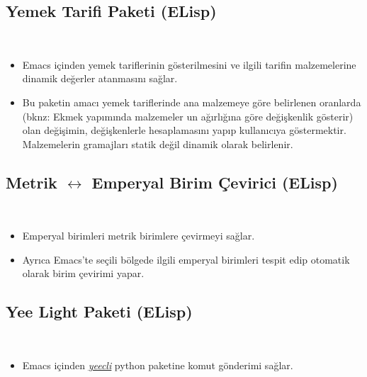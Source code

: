 \documentclass[a4paper, 9pt]{extarticle}
\begin{document}
\subsection{Yemek Tarifi Paketi (ELisp)} \label{lisp:frp} \hfill \\
\begin{itemize}
	\item Emacs içinden yemek tariflerinin gösterilmesini ve ilgili tarifin
	malzemelerine dinamik değerler atanmasını sağlar.
	\item Bu paketin amacı yemek tariflerinde ana malzemeye göre belirlenen
	oranlarda (bknz: Ekmek yapımında malzemeler un ağırlığına göre değişkenlik
	gösterir) olan değişimin, değişkenlerle hesaplamasını yapıp kullanıcıya
	göstermektir. Malzemelerin gramajları statik değil dinamik olarak belirlenir.
\end{itemize}

\subsection{Metrik $\longleftrightarrow$ Emperyal Birim Çevirici (ELisp)}
\hfill \\
\begin{itemize}
	\item Emperyal birimleri metrik birimlere çevirmeyi sağlar.
	\item Ayrıca Emacs'te seçili bölgede ilgili emperyal birimleri tespit edip
	otomatik olarak birim çevirimi yapar.
\end{itemize}


\subsection{Yee Light Paketi (ELisp)} \hfill \\
\begin{itemize}
	\item Emacs içinden \underline{\emph{\href{https://gitlab.com/stavros/yeecli/-/tree/master}{yeecli}}} python paketine komut gönderimi sağlar.
\end{itemize}
\end{document}
